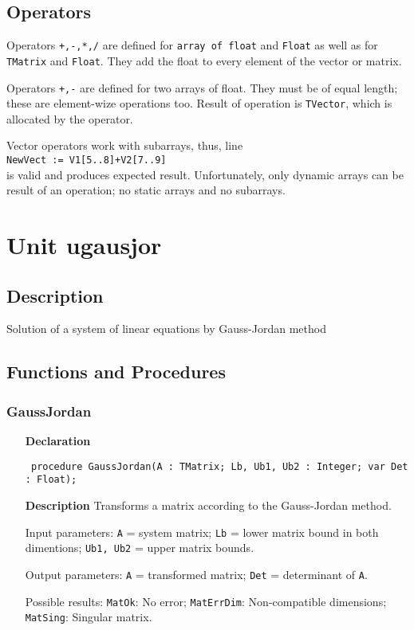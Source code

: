 \documentclass[12pt,a4paper,oneside]{report}
\newcommand{\declarationitem}[1]{\textbf{#1}}
\newcommand{\descriptiontitle}[1]{\textbf{#1}}
\newcommand{\code}[1]{\texttt{#1}}
\begin{document}
\subsection{Operators}
Operators \code{+,-,*,/} are defined for \code{array of float} and \code{Float} as well as for \code{TMatrix} and \code{Float}. They add the float to every element of the vector or matrix.

Operators \code{+,-} are defined for two arrays of float. They must be of equal length; these are element-wize operations too. Result of operation is \code{TVector}, which is allocated by the operator.

Vector operators work with subarrays, thus, line\\
 \code{NewVect := V1[5..8]+V2[7..9]}\\
is valid and produces expected result. Unfortunately, only dynamic arrays can be result of an operation; no static arrays and no subarrays.
 
\section{Unit ugausjor}
\label{ugausjor}
\subsection{Description}
Solution of a system of linear equations by Gauss{-}Jordan method
\subsection{Functions and Procedures}
\subsubsection{GaussJordan}
\label{ugausjor-GaussJordan}
\begin{itemize}\item[\declarationitem{Declaration}\hfill]
	\begin{flushleft}
		\code{
			procedure GaussJordan(A : TMatrix; Lb, Ub1, Ub2 : Integer; var Det : Float);}
		
	\end{flushleft}
	
	\par
	\item[\descriptiontitle{Description}]
	Transforms a matrix according to the Gauss{-}Jordan method.
	
	Input parameters: \code{A} = system matrix; \code{Lb} = lower matrix bound in both dimentions; \code{Ub1, Ub2} = upper matrix bounds.
	
	Output parameters: \code{A} = transformed matrix; \code{Det} = determinant of \code{A}.
	
	Possible results: \code{MatOk}: No error; \code{MatErrDim}: Non{-}compatible dimensions; \code{MatSing}: Singular matrix.
	
\end{itemize}
\end{document}
